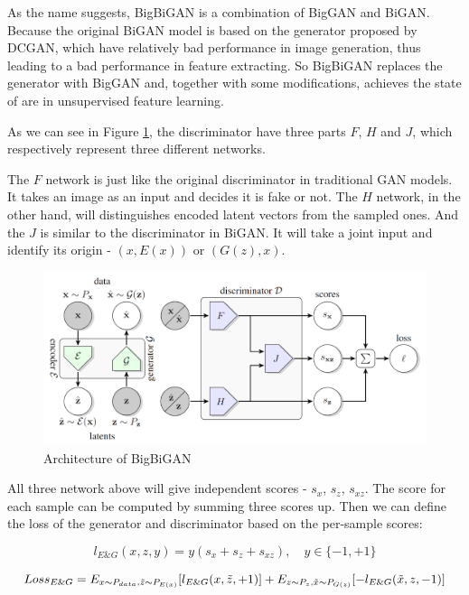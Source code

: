 \documentclass{article} %
\begin{document}
As the name suggests, BigBiGAN is a combination of BigGAN and BiGAN. Because the original BiGAN model is based on the generator proposed by DCGAN, which have relatively bad performance in image generation, thus leading to a bad performance in feature extracting. So BigBiGAN replaces the generator with BigGAN and, together with some modifications, achieves the state of are in unsupervised feature learning.

As we can see in Figure \ref{fig:BigBiGAN}, the discriminator have three parts $F$, $H$ and $J$, which respectively represent three different networks. 

The $F$ network is just like the original discriminator in traditional GAN models. It takes an image as an input and decides it is fake or not. The $H$ network, in the other hand, will distinguishes encoded latent vectors from the sampled ones. And the $J$ is similar to the discriminator in BiGAN. It will take a joint input and identify its origin - $(x, E(x))$ or $(G(z), x)$.

\begin{figure}[h]
	\centering
	\includegraphics[width=0.8\linewidth]{figures/BigBiGAN.png}
	\caption{Architecture of BigBiGAN}
	\label{fig:BigBiGAN}
\end{figure}

All three network above will give independent scores - $s_x$, $s_z$, $s_{xz}$. The score for each sample can be computed by summing three scores up. Then we can define the loss of the generator and discriminator based on the per-sample scores:

\begin{equation}
    l_{E \& G}(x,z,y) = y(s_x + s_z + s_{xz}), \quad y \in \{-1,+1\}
\end{equation}

\begin{equation}
    Loss_{E \& G}= E_{x \sim P_{data}, \Tilde{z} \sim P_{E(x)}}[l_{E \& G}(x,\Tilde{z},+1)] + E_{z \sim P_z, \Tilde{x} \sim P_{G(z)}}[-l_{E \& G}(\Tilde{x},z,-1)]
\end{equation}
\end{document}
